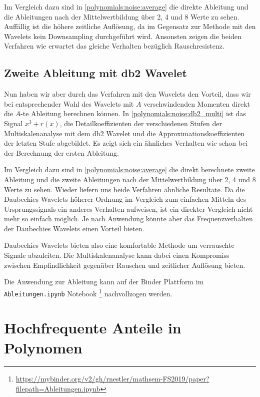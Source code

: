 \begin{refsection}
Im Vergleich dazu sind in \cref{polynomials:noise:average} die direkte
Ableitung und die Ableitungen nach der Mittelwertbildung über 2, 4 und 8 Werte
zu sehen. Auffällig ist die höhere zeitliche Auflösung, da im Gegensatz zur
Methode mit den Wavelets kein Downsampling durchgeführt wird. Ansonsten zeigen
die beiden Verfahren wie erwartet das gleiche Verhalten bezüglich
Rauschresistenz.

\subsection{Zweite Ableitung mit db2 Wavelet}

Nun haben wir aber durch das Verfahren mit den Wavelets den Vorteil, dass wir
bei entsprechender Wahl des Wavelets mit $A$ verschwindenden Momenten direkt
die $A$-te Ableitung berechnen können.
In \cref{polynomials:noise:db2_multi} ist das Signal $x^3 + r(x)$, die
Detailkoeffizienten der verschiedenen Stufen der Multiskalenanalyse mit dem db2
Wavelet und die Approximationskoeffizienten der letzten Stufe abgebildet.
Es zeigt sich ein ähnliches Verhalten wie schon bei der Berechnung der ersten
Ableitung.

Im Vergleich dazu sind in \cref{polynomials:noise:average} die direkt
berechnete zweite Ableitung und die zweite Ableitungen nach der
Mittelwertbildung über 2, 4 und 8 Werte zu sehen.
Wieder liefern uns beide Verfahren ähnliche Resultate. Da die Daubechies
Wavelets höherer Ordnung im Vergleich zum einfachen Mitteln des
Ursprungssignals ein anderes Verhalten aufweisen, ist ein direkter Vergleich
nicht mehr so einfach möglich. Je nach Anwendung könnte aber das
Frequenzverhalten der Daubechies Wavelets einen Vorteil bieten.

Daubechies Wavelets bieten also eine komfortable Methode um verrauschte Signale
abzuleiten. Die Multiskalenanalyse kann dabei einen Kompromiss zwischen
Empfindlichkeit gegenüber Rauschen und zeitlicher Auflösung bieten.

Die Anwendung zur Ableitung kann auf der Binder Plattform im
\texttt{Ableitungen.ipynb} Notebook%
\footnote{\url{https://mybinder.org/v2/gh/rnestler/mathsem-FS2019/paper?filepath=Ableitungen.ipynb}}
nachvollzogen werden.

\section{Hochfrequente Anteile in Polynomen}


\end{refsection}
